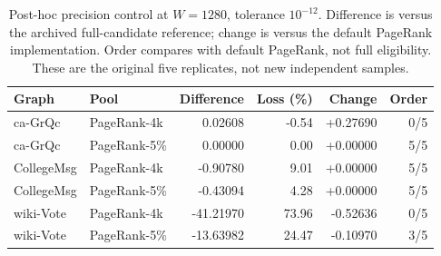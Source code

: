 \begin{table}[htbp]
\caption{Post-hoc precision control at $W=1280$, tolerance $10^{-12}$. Difference is versus the archived full-candidate reference; change is versus the default PageRank implementation. Order compares with default PageRank, not full eligibility. These are the original five replicates, not new independent samples.}\label{tab:precision}
\begin{tabular}{llrrrr}
\toprule
Graph & Pool & Difference & Loss (\%) & Change & Order \\
\midrule
ca-GrQc & PageRank-4k & 0.02608 & -0.54 & +0.27690 & 0/5 \\
ca-GrQc & PageRank-5\% & 0.00000 & 0.00 & +0.00000 & 5/5 \\
CollegeMsg & PageRank-4k & -0.90780 & 9.01 & +0.00000 & 5/5 \\
CollegeMsg & PageRank-5\% & -0.43094 & 4.28 & +0.00000 & 5/5 \\
wiki-Vote & PageRank-4k & -41.21970 & 73.96 & -0.52636 & 0/5 \\
wiki-Vote & PageRank-5\% & -13.63982 & 24.47 & -0.10970 & 3/5 \\
\bottomrule
\end{tabular}
\end{table}
